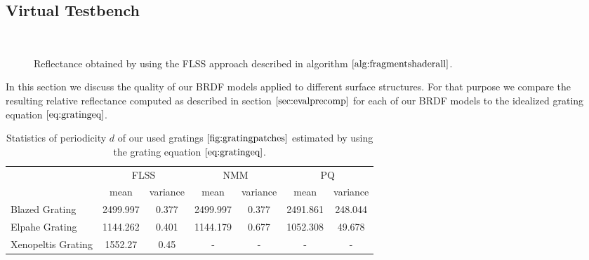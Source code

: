 \subsection{Virtual Testbench}
\label{sec:virtualtestbench}
\begin{figure}[H]
  \centering
~
  

\caption[Validation of FLSS Approach applied on our Gratings]{Reflectance obtained by using the FLSS approach described in algorithm $\ref{alg:fragmentshaderall}$.}
\label{fig:evaluationdiffshaderalllambda}
\end{figure}

In this section we discuss the quality of our BRDF models applied to different surface structures. For that purpose we compare the resulting relative reflectance computed as described in section $\ref{sec:evalprecomp}$ for each of our BRDF models to the idealized grating equation $\ref{eq:gratingeq}$. 

\begin{table}[H]
\centering
\begin{tabular}{l|c|c|c|c|c|c|}
\cline{2-7}
                                         & \multicolumn{2}{c|}{FLSS} & \multicolumn{2}{c|}{NMM} & \multicolumn{2}{c|}{PQ} \\ \cline{2-7} 
                                         & mean        & variance    & mean        & variance   & mean       & variance   \\ \hline
\multicolumn{1}{|l|}{Blazed Grating}     & 2499.997    & 0.377       & 2499.997    & 0.377      & 2491.861   & 248.044    \\ \hline
\multicolumn{1}{|l|}{Elpahe Grating}     & 1144.262    & 0.401       & 1144.179    & 0.677      & 1052.308   & 49.678     \\ \hline
\multicolumn{1}{|l|}{Xenopeltis Grating} & 1552.27     & 0.45        & -           & -          & -          & -          \\ \hline
\end{tabular}
\caption[Estimated Grating Spacings]{Statistics of periodicity $d$ of our used gratings $\ref{fig:gratingpatches}$ estimated by using the grating equation $\ref{eq:gratingeq}$.}
\label{tab:gratingsmeanvariance}
\end{table}

